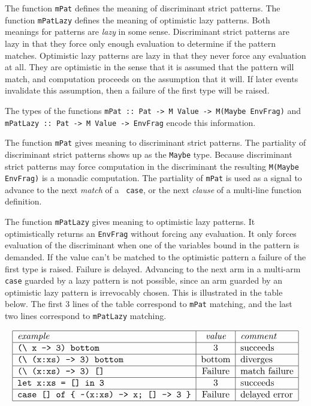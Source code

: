 \documentclass{entcs} \usepackage{entcsmacro}
\begin{document}
The function {\tt mPat} defines the meaning of discriminant strict patterns. The
function {\tt mPatLazy} defines the meaning of optimistic lazy patterns. Both
meanings for patterns are {\em lazy} in some sense. Discriminant strict patterns
are lazy in that they force only enough evaluation to determine if the
pattern matches. Optimistic lazy patterns are lazy in that they never force
any evaluation at all. They are optimistic in the sense that it is assumed that
the pattern will match, and computation proceeds on the assumption that it will.
If later events invalidate this assumption, then a failure of the first type
will be raised.

The types of the functions {\tt mPat :: Pat -> M Value -> M(Maybe EnvFrag)} and
{\tt mPatLazy :: Pat -> M Value -> EnvFrag} encode this information. 

The function {\tt mPat} gives meaning to discriminant strict patterns. The
partiality of discriminant strict patterns shows up as the {\tt Maybe} type.
Because discriminant strict patterns may force computation in the discriminant
the resulting {\tt M(Maybe EnvFrag)} is a monadic computation. The partiality of
{\tt mPat} is used as a signal to advance to the next {\em match} of a {\tt
case}, or the next {\em clause} of a multi-line function definition.

The function {\tt mPatLazy} gives meaning to optimistic lazy patterns. It
optimistically returns an {\tt EnvFrag} without forcing any evaluation. It only
forces evaluation of the discriminant when one of the variables bound in the
pattern is demanded. If the value can't be matched to the optimistic pattern a
failure of the first type is raised. Failure is delayed. Advancing to the next arm
in a multi-arm {\tt case} guarded by a lazy pattern is not possible, since an
arm guarded by an optimistic lazy pattern is irrevocably chosen. This is illustrated in the table
below. The first 3 lines of the table correspond to {\tt mPat} matching, and the
last two lines correspond to {\tt mPatLazy} matching.

\[
{\small
\begin{tabular}{|l|c|l|} \hline
{\em example} & {\em value} & {\em comment} \\ \hline
\verb+(\ x -> 3) bottom+  & 3 & succeeds  \\ \hline
\verb+(\ (x:xs) -> 3) bottom+  & bottom & diverges  \\ \hline
\verb+(\ (x:xs) -> 3) []+ & Failure & match failure \\ \hline
\verb+let x:xs = [] in 3+  & 3 &  succeeds \\ \hline
\verb+case [] of { ~(x:xs) -> x; [] -> 3 }+ &  Failure & delayed error \\ \hline
\end{tabular}
}
\]
\end{document}
